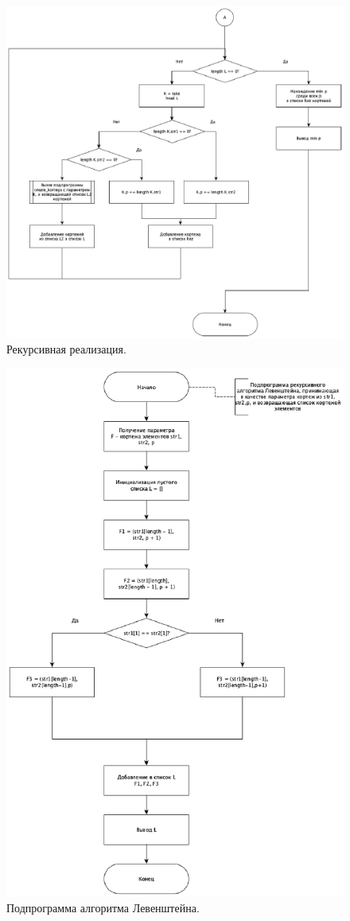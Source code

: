 \documentclass[12pt]{report}
\begin{document}
\begin{figure}[h!]
\begin{minipage}[h!]{0.49\linewidth}
   		\includegraphics[width=1.6\linewidth]{LevenR_part2}
   \end{minipage}
   	\caption{Рекурсивная реализация.}
   	\label{ris:image1}
   \end{figure}

\newpage


	\begin{figure}[h!]
		\centering
		\includegraphics[width=0.7\linewidth]{LevenR_sub}
		\caption{Подпрограмма алгоритма Левенштейна.}
		\label{ris:image2}
	\end{figure}
\end{document}
